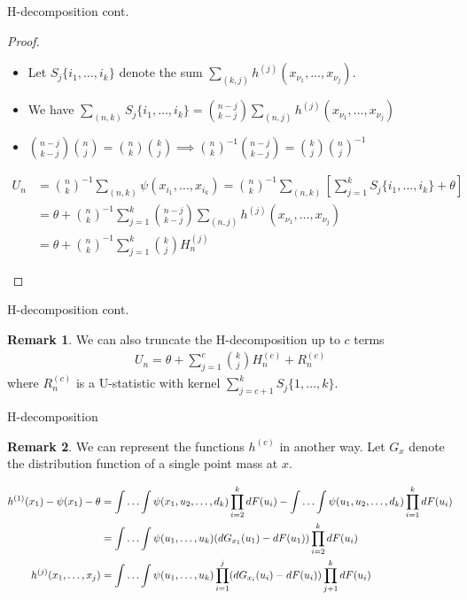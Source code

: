 \documentclass{beamer}
\theoremstyle{definition}
\numberwithin{Def}{section}
\newtheorem{Rmk}{Remark}
\begin{document}
\begin{frame}{H-decomposition cont. }
\begin{proof}
\begin{itemize}
    \item Let $S_j\{i_1, \dotsc, i_k\}$ denote the sum $\sum_{(k,j)} h^{(j)}(x_{\nu_1}, \dotsc, x_{\nu_j})$. 
    \item We have $\sum_{(n,k)}S_j\{i_1, \dotsc, i_k\} = {n-j \choose k-j}\sum_{(n,j)}h^{(j)}(x_{\nu_1}, \dotsc, x_{\nu_j})$ 
    \item  ${n-j \choose k-j}{n \choose j} = {n \choose k}{k \choose j} \implies {n \choose k}^{-1}{n-j \choose k-j} = {k \choose j}{n \choose j}^{-1}$
\end{itemize}
\begin{fontsize}{10}{12}
\begin{align*}
    U_n &= {n \choose k}^{-1}\sum_{(n,k)}\psi(x_{i_1}, \dotsc, x_{i_k}) = {n \choose k}^{-1}\sum_{(n,k)}\left[\sum_{j=1}^kS_j\{i_1, \dotsc, i_k\} + \theta \right] \\
    &= \theta + {n \choose k}^{-1}\sum_{j=1}^k{n-j \choose k-j}\sum_{(n,j)}h^{(j)}(x_{\nu_1}, \dotsc, x_{\nu_j}) \\
    &= \theta + {n \choose k}^{-1}\sum_{j=1}^k{k \choose j}H_n^{(j)}
\end{align*}
\end{fontsize}
\end{proof}    
\end{frame}

\begin{frame}{H-decomposition cont. }
\begin{Rmk}
We can also truncate the H-decomposition up to $c$ terms 
\begin{align}
    U_n = \theta + \sum_{j=1}^c{k \choose j} H_n^{(c)} + R_n^{(c)}
\end{align}
where $R_n^{(c)}$ is a U-statistic with kernel $\sum_{j=c+1}^k S_j\{1, \dotsc, k\}$.  
\end{Rmk}
\end{frame}

\begin{frame}{H-decomposition}
\begin{Rmk}
We can represent the functions $h^{(c)}$ in another way. Let $G_x$ denote the distribution function of a single point mass at $x$. 
\begin{fontsize}{6.5}{12}
\begin{align}
    h^{(1)}(x_1) - \psi(x_1) - \theta  &= \int \dotsc \int \psi(x_1, u_2, \dotsc, d_k)\prod_{i=2}^k dF(u_i) - \int \dotsc \int \psi(u_1, u_2, \dotsc, d_k)\prod_{i=1}^k dF(u_i) \notag \\
    &= \int \dotsc \int \psi(u_1, \dotsc, u_k)(dG_{x_1}(u_1) - dF(u_1))\prod_{i=2}^k dF(u_i) \notag \\
    h^{(j)}(x_1, \dotsc, x_j) &= \int \dotsc \int \psi(u_1, \dotsc, u_k) \prod_{i=1}^j(dG_{x_i}(u_i) - dF(u_i))\prod_{j+1}^kdF(u_i) \label{h_func_rep}
\end{align}
\end{fontsize}
\end{Rmk}    
\end{frame}
\end{document}
